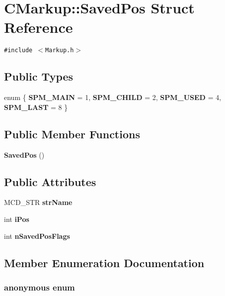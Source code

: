 \section{CMarkup::SavedPos Struct Reference}
\label{structCMarkup_1_1SavedPos}
{\tt \#include $<$Markup.h$>$}

\subsection*{Public Types}
\begin{CompactItemize}
\item 
enum \{ {\bf SPM\_\-MAIN} =  1, 
{\bf SPM\_\-CHILD} =  2, 
{\bf SPM\_\-USED} =  4, 
{\bf SPM\_\-LAST} =  8
 \}
\end{CompactItemize}
\subsection*{Public Member Functions}
\begin{CompactItemize}
\item 
{\bf SavedPos} ()
\end{CompactItemize}
\subsection*{Public Attributes}
\begin{CompactItemize}
\item 
MCD\_\-STR {\bf strName}
\item 
int {\bf iPos}
\item 
int {\bf nSavedPosFlags}
\end{CompactItemize}


\subsection{Member Enumeration Documentation}
\subsubsection["@0]{\setlength{\rightskip}{0pt plus 5cm}anonymous enum}\label{structCMarkup_1_1SavedPos_28ed16429117003133c33fa8fcaa7924}


